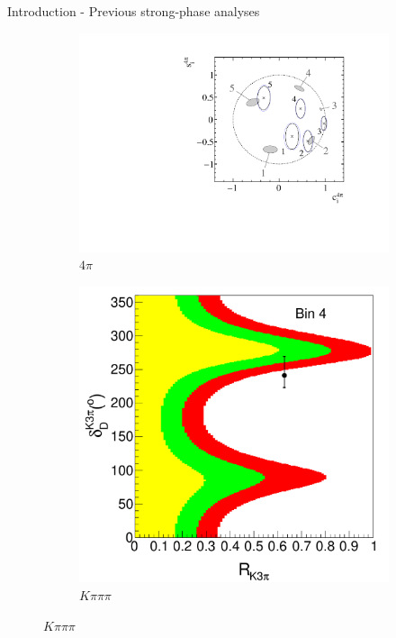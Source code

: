 \documentclass{beamer}
\begin{document}
\begin{frame}{Introduction - Previous strong-phase analyses}
\begin{figure}
\begin{subfigure}{0.39\textwidth}
      \includegraphics[width=1.0\textwidth,trim={0 0.2cm 0 0},clip=true]{Plots/4pi_cisi.pdf}
      \caption{$4\pi$}
    \end{subfigure}%
    \begin{subfigure}{0.30\textwidth}
      \centering
      \includegraphics[width=1.0\textwidth,trim={0 0.15cm 0 0},clip=true]{Plots/K3pi_bin4.pdf}
      \caption{$K\pi\pi\pi$}
    \end{subfigure}
  \end{figure}
\end{frame}
\end{document}
